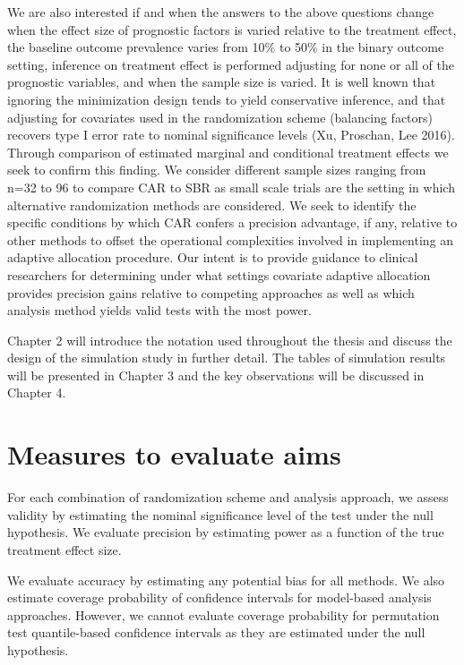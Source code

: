 We are also interested if and when the answers to the above questions change when the effect size of prognostic factors is varied relative to the treatment effect, the baseline outcome prevalence varies from 10\% to 50\% in the binary outcome setting, inference on treatment effect is performed adjusting for none or all of the prognostic variables, and when the sample size is varied.
It is well known that ignoring the minimization design tends to yield conservative inference, and that adjusting for covariates used in the randomization scheme (balancing factors) recovers type I error rate to nominal significance levels (Xu, Proschan, Lee 2016). 
Through comparison of estimated marginal and conditional treatment effects we seek to confirm this finding.
We consider different sample sizes ranging from n=32 to 96 to compare CAR to SBR as small scale trials are the setting in which alternative randomization methods are considered. 
We seek to identify the specific conditions by which CAR confers a precision advantage, if any, relative to other methods to offset the operational complexities involved in implementing an adaptive allocation procedure.  
Our intent is to provide guidance to clinical researchers for determining under what settings covariate adaptive allocation provides precision gains relative to competing approaches as well as which analysis method yields valid tests with the most power. 

Chapter 2 will introduce the notation used throughout the thesis and discuss the design of the simulation study in further detail. 
The tables of simulation results will be presented in Chapter 3 and the key observations will be discussed in Chapter 4.

\section{Measures to evaluate aims}
For each combination of randomization scheme and analysis approach, we assess validity by estimating the nominal significance level of the test under the null hypothesis.  
We evaluate precision by estimating power as a function of the true treatment effect size. 

We evaluate accuracy by estimating any potential bias for all methods.
We also estimate coverage probability of confidence intervals for model-based analysis approaches.
However, we cannot evaluate coverage probability for permutation test quantile-based confidence intervals as they are estimated under the null hypothesis.
 


